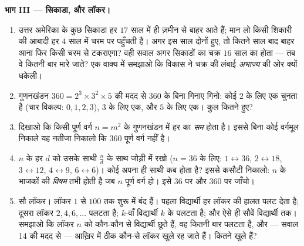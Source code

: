 \begin{problem}
\medskip
\noindent\textbf{भाग III --- सिकाडा,  और लॉकर।}
\begin{enumerate}[resume]
  \item उत्तर अमेरिका के कुछ सिकाडा हर $17$ साल में ही ज़मीन से बाहर
        आते हैं; मान लो किसी शिकारी की आबादी हर $4$ साल में चरम पर
        पहुँचती है। अगर इस साल दोनों हुए, तो कितने साल बाद बाहर आना
        फिर किसी चरम से टकराएगा? वही सवाल अगर सिकाडों का चक्र $16$
        साल का होता --- तब वे कितनी बार मारे जाते? एक वाक्य में
        समझाओ कि विकास ने चक्र की लंबाई \emph{अभाज्य} की ओर क्यों
        धकेली।
  \item गुणनखंडन $360 = 2^3 \times 3^2 \times 5$ की मदद से $360$ के
         बिना गिनाए गिनो: कोई  $2$ के लिए एक  चुनता है
        (चार विकल्प: $0, 1, 2, 3$), $3$ के लिए एक, और $5$ के लिए
        एक। कुल कितने  हुए?
  \item दिखाओ कि किसी पूर्ण वर्ग $n = m^2$ के गुणनखंडन में हर  का  \emph{सम} होता है। इससे बिना कोई वर्गमूल
        निकाले यह नतीजा निकालो कि $360$ पूर्ण वर्ग नहीं है।
  \item $n$ के हर  $d$ को उसके साथी $\frac{n}{d}$ के साथ जोड़ी
        में रखो ($n = 36$ के लिए: $1 \leftrightarrow 36$,
        $2 \leftrightarrow 18$, $3 \leftrightarrow 12$,
        $4 \leftrightarrow 9$, $6 \leftrightarrow 6$)। कोई  अपना
        ही साथी कब होता है? इससे कसौटी निकालो: $n$ के भाजकों की
         \emph{विषम} तभी होती है जब $n$ पूर्ण वर्ग हो। इसे
        $36$ पर और $360$ पर जाँचो।
  \item सौ लॉकर। लॉकर $1$ से $100$ तक शुरू में बंद हैं। पहला
        विद्यार्थी हर लॉकर की हालत पलट देता है; दूसरा लॉकर
        $2, 4, 6, \dots$ पलटता है; $k$-वाँ विद्यार्थी $k$ के 
        पलटता है; और ऐसे ही सौवें विद्यार्थी तक। समझाओ कि लॉकर $n$
        को कौन-कौन से विद्यार्थी छूते हैं, वह कितनी बार पलटता है, और
        --- सवाल 14 की मदद से --- आख़िर में ठीक कौन-से लॉकर खुले रह
        जाते हैं। कितने खुले हैं?

\end{enumerate}
\end{problem}
